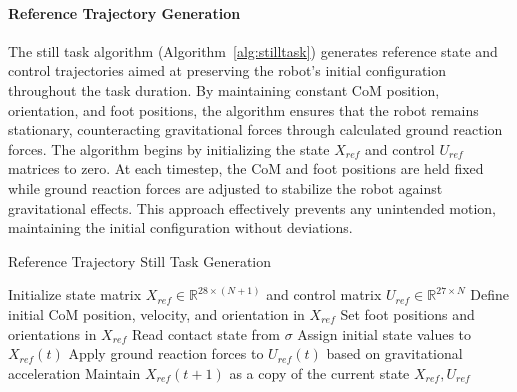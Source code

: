 \documentclass[main.tex]{subfiles}
\begin{document}
\paragraph{Reference Trajectory Generation}  
The still task algorithm (Algorithm~\ref{alg:stilltask}) generates reference state and control trajectories aimed at preserving the robot’s initial configuration throughout the task duration. By maintaining constant CoM position, orientation, and foot positions, the algorithm ensures that the robot remains stationary, counteracting gravitational forces through calculated ground reaction forces. The algorithm begins by initializing the state \( X_{ref} \) and control \( U_{ref} \) matrices to zero. At each timestep, the CoM and foot positions are held fixed while ground reaction forces are adjusted to stabilize the robot against gravitational effects. This approach effectively prevents any unintended motion, maintaining the initial configuration without deviations.\\
\begin{algorithm}[H]
\caption{Reference Trajectory Still Task Generation}
\label{alg:stilltask}
\begin{algorithmic}[1]
\State Initialize state matrix \( X_{ref} \in \mathbb{R}^{28 \times (N+1)} \) and control matrix \( U_{ref} \in \mathbb{R}^{27 \times N} \)
\State Define initial CoM position, velocity, and orientation in \( X_{ref} \)
\State Set foot positions and orientations in \( X_{ref} \)
    \State Read contact state from \( \sigma \)
    \State Assign initial state values to \( X_{ref}(t) \)
    \State Apply ground reaction forces to \( U_{ref}(t) \) based on gravitational acceleration
    \State Maintain \( X_{ref}(t+1) \) as a copy of the current state
\EndFor
\State \Return \( X_{ref}, U_{ref} \)
\end{algorithmic}
\end{algorithm}
\end{document}
